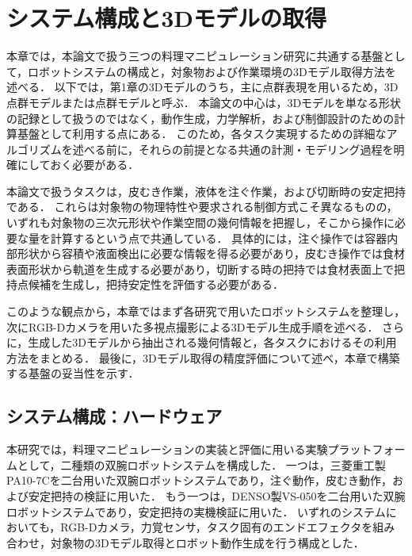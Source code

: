 \chapter{システム構成と3Dモデルの取得}
\label{ch:system}

本章では，本論文で扱う三つの料理マニピュレーション研究に共通する基盤として，ロボットシステムの構成と，対象物および作業環境の3Dモデル取得方法を述べる．
以下では，第1章の3Dモデルのうち，主に点群表現を用いるため，3D点群モデルまたは点群モデルと呼ぶ．
本論文の中心は，3Dモデルを単なる形状の記録として扱うのではなく，動作生成，力学解析，および制御設計のための計算基盤として利用する点にある．
このため，各タスク実現するための詳細なアルゴリズムを述べる前に，それらの前提となる共通の計測・モデリング過程を明確にしておく必要がある．

本論文で扱うタスクは，皮むき作業，液体を注ぐ作業，および切断時の安定把持である．
これらは対象物の物理特性や要求される制御方式こそ異なるものの，いずれも対象物の三次元形状や作業空間の幾何情報を把握し，そこから操作に必要な量を計算するという点で共通している．
具体的には，注ぐ操作では容器内部形状から容積や液面検出に必要な情報を得る必要があり，皮むき操作では食材表面形状から軌道を生成する必要があり，切断する時の把持では食材表面上で把持点候補を生成し，把持安定性を評価する必要がある．


このような観点から，本章ではまず各研究で用いたロボットシステムを整理し，次にRGB-Dカメラを用いた多視点撮影による3Dモデル生成手順を述べる．
さらに，生成した3Dモデルから抽出される幾何情報と，各タスクにおけるその利用方法をまとめる．
最後に，3Dモデル取得の精度評価について述べ，本章で構築する基盤の妥当性を示す．

\section{システム構成：ハードウェア}
\label{sec:system:hardware}

本研究では，料理マニピュレーションの実装と評価に用いる実験プラットフォームとして，二種類の双腕ロボットシステムを構成した．
一つは，三菱重工製PA10-7Cを二台用いた双腕ロボットシステムであり，注ぐ動作，皮むき動作，および安定把持の検証に用いた．
もう一つは，DENSO製VS-050を二台用いた双腕ロボットシステムであり，安定把持の実機検証に用いた．
いずれのシステムにおいても，RGB-Dカメラ，力覚センサ，タスク固有のエンドエフェクタを組み合わせ，対象物の3Dモデル取得とロボット動作生成を行う構成とした．


